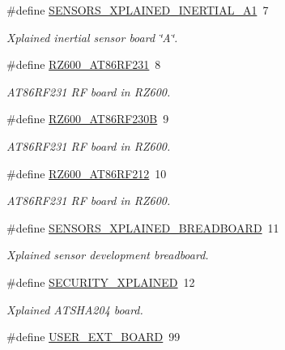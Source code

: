 \begin{DoxyCompactItemize}
\#define \hyperlink{group__group__common__boards_ga7796d1fa6e31b50714c391877e095801}{S\-E\-N\-S\-O\-R\-S\-\_\-\-X\-P\-L\-A\-I\-N\-E\-D\-\_\-\-I\-N\-E\-R\-T\-I\-A\-L\-\_\-\-A1}~7
\begin{DoxyCompactList}\small\item\em Xplained inertial sensor board \char`\"{}\-A\char`\"{}. \end{DoxyCompactList}\item 
\#define \hyperlink{group__group__common__boards_gab07c6fafd717c9bf1fcf482710a10f9d}{R\-Z600\-\_\-\-A\-T86\-R\-F231}~8
\begin{DoxyCompactList}\small\item\em A\-T86\-R\-F231 R\-F board in R\-Z600. \end{DoxyCompactList}\item 
\#define \hyperlink{group__group__common__boards_gabfbfb1013bb6a4eb8f445c7e06af3178}{R\-Z600\-\_\-\-A\-T86\-R\-F230\-B}~9
\begin{DoxyCompactList}\small\item\em A\-T86\-R\-F231 R\-F board in R\-Z600. \end{DoxyCompactList}\item 
\#define \hyperlink{group__group__common__boards_ga06539607f7c8a0104557c4b4cc7ac175}{R\-Z600\-\_\-\-A\-T86\-R\-F212}~10
\begin{DoxyCompactList}\small\item\em A\-T86\-R\-F231 R\-F board in R\-Z600. \end{DoxyCompactList}\item 
\#define \hyperlink{group__group__common__boards_ga80102032338e3add4f64cbc40efc4376}{S\-E\-N\-S\-O\-R\-S\-\_\-\-X\-P\-L\-A\-I\-N\-E\-D\-\_\-\-B\-R\-E\-A\-D\-B\-O\-A\-R\-D}~11
\begin{DoxyCompactList}\small\item\em Xplained sensor development breadboard. \end{DoxyCompactList}\item 
\#define \hyperlink{group__group__common__boards_ga00921a34b346ce468cedc9a09b58a881}{S\-E\-C\-U\-R\-I\-T\-Y\-\_\-\-X\-P\-L\-A\-I\-N\-E\-D}~12
\begin{DoxyCompactList}\small\item\em Xplained A\-T\-S\-H\-A204 board. \end{DoxyCompactList}\item 
\#define \hyperlink{group__group__common__boards_gaf75bc91f67cb2a761894691a9175a639}{U\-S\-E\-R\-\_\-\-E\-X\-T\-\_\-\-B\-O\-A\-R\-D}~99
\end{DoxyCompactItemize}


